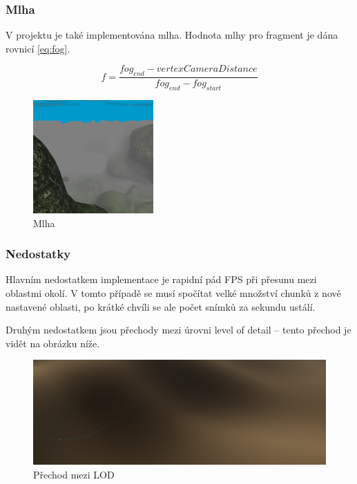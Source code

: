 \documentclass[12pt,a4paper,titlepage,final]{report}
\begin{document}
\subsubsection{Mlha}
V projektu je také implementována mlha. Hodnota mlhy pro fragment je dána rovnicí \ref{eq:fog}.

    \begin{equation}\label{eq:fog}
    f = \frac{fog_{end} - vertexCameraDistance}{fog_{end} - fog_{start}}
    \end{equation}

\begin{figure}[H]
    \centering
    \includegraphics[scale=1]{images/fog.png}
    \caption{Mlha}
    \label{fig:fog}
\end{figure}

\subsubsection{Nedostatky}
Hlavním nedostatkem implementace je rapidní pád FPS při přesunu mezi oblastmi okolí. V tomto případě se musí spočítat velké množství chunků z nově nastavené oblasti, po krátké chvíli se ale počet snímků za sekundu ustálí.

Druhým nedostatkem jsou přechody mezi úrovni level of detail -- tento přechod je vidět na obrázku níže.

\begin{figure}[H]
    \centering
    \includegraphics[scale=1]{images/seam.png}
    \caption{Přechod mezi LOD}
    \label{fig:seam}
\end{figure}
\end{document}
